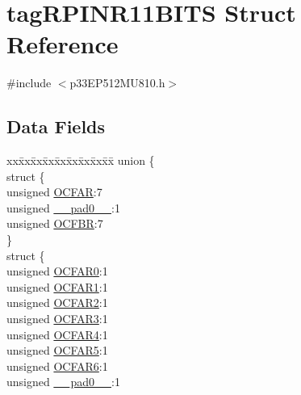 \hypertarget{structtag_r_p_i_n_r11_b_i_t_s}{}\section{tag\+R\+P\+I\+N\+R11\+B\+I\+TS Struct Reference}
\label{structtag_r_p_i_n_r11_b_i_t_s}


{\ttfamily \#include $<$p33\+E\+P512\+M\+U810.\+h$>$}

\subsection*{Data Fields}
\begin{DoxyCompactItemize}
\item 
\begin{tabbing}
xx\=xx\=xx\=xx\=xx\=xx\=xx\=xx\=xx\=\kill
union \{\\
\>struct \{\\
\>\>unsigned \hyperlink{structtag_r_p_i_n_r11_b_i_t_s_a2bc0f4c3ba3ca6afb693a30eccb11c31}{OCFAR}:7\\
\>\>unsigned \hyperlink{structtag_r_p_i_n_r11_b_i_t_s_adf71f3d8410c1f1dbbc96680a92c49af}{\_\_pad0\_\_}:1\\
\>\>unsigned \hyperlink{structtag_r_p_i_n_r11_b_i_t_s_a5bfd240dd47ab36a2146697ec6236da2}{OCFBR}:7\\
\>\} \\
\>struct \{\\
\>\>unsigned \hyperlink{structtag_r_p_i_n_r11_b_i_t_s_a616388432dc3a760aec85f7c27e5888e}{OCFAR0}:1\\
\>\>unsigned \hyperlink{structtag_r_p_i_n_r11_b_i_t_s_ad3a5baee03e94a47f0f0e19812ae0128}{OCFAR1}:1\\
\>\>unsigned \hyperlink{structtag_r_p_i_n_r11_b_i_t_s_a3ec9c890e6ab771787737e5e34e12fd7}{OCFAR2}:1\\
\>\>unsigned \hyperlink{structtag_r_p_i_n_r11_b_i_t_s_a4f0bd068765f9edb730dbedee3e760b9}{OCFAR3}:1\\
\>\>unsigned \hyperlink{structtag_r_p_i_n_r11_b_i_t_s_a33dd3ee3fb9a5b12783ed3528330caca}{OCFAR4}:1\\
\>\>unsigned \hyperlink{structtag_r_p_i_n_r11_b_i_t_s_a0bfacb31921d27ab2a4c7dada97d2c33}{OCFAR5}:1\\
\>\>unsigned \hyperlink{structtag_r_p_i_n_r11_b_i_t_s_a8fdecbd074438d2af526e4d800159889}{OCFAR6}:1\\
\>\>unsigned \hyperlink{structtag_r_p_i_n_r11_b_i_t_s_adf71f3d8410c1f1dbbc96680a92c49af}{\_\_pad0\_\_}:1\\

\end{tabbing}
\end{DoxyCompactItemize}
